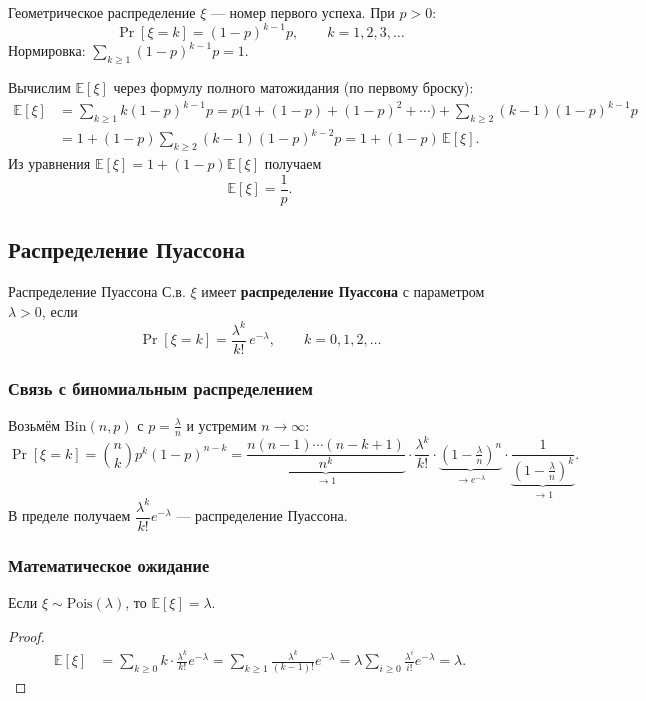 \begin{Example}{Геометрическое распределение}{}
	$\xi$ — номер первого успеха. При $p>0$:
	\[
	\Pr[\xi=k]=(1-p)^{k-1}p,\qquad k=1,2,3,\dots
	\]
	Нормировка: $\sum_{k\ge 1}(1-p)^{k-1}p=1$.
\end{Example}

Вычислим $\mathbb{E}[\xi]$ через формулу полного матожидания (по первому броску):
\begin{align*}
	\mathbb{E}[\xi]
	&=\sum_{k\ge 1}k(1-p)^{k-1}p
	=p\bigl(1+(1-p)+(1-p)^2+\cdots\bigr)+\sum_{k\ge 2}(k-1)(1-p)^{k-1}p\\
	&=1+(1-p)\sum_{k\ge 2}(k-1)(1-p)^{k-2}p
	=1+(1-p)\,\mathbb{E}[\xi].
\end{align*}
Из уравнения $\mathbb{E}[\xi]=1+(1-p)\mathbb{E}[\xi]$ получаем
\[
\mathbb{E}[\xi]=\frac1p.
\]

\subsection{Распределение Пуассона}

\begin{Definition}{Распределение Пуассона}{}
	С.в. $\xi$ имеет \textbf{распределение Пуассона} с параметром $\lambda>0$, если
	\[
	\Pr[\xi=k]=\frac{\lambda^k}{k!}\,e^{-\lambda},\qquad k=0,1,2,\dots
	\]
\end{Definition}

\subsubsection*{Связь с биномиальным распределением}

Возьмём $\mathrm{Bin}(n,p)$ с $p=\tfrac{\lambda}{n}$ и устремим $n\to\infty$:
\[
\Pr[\xi=k]=\binom{n}{k}p^k(1-p)^{n-k}
=\underbrace{\frac{n(n-1)\cdots(n-k+1)}{n^k}}_{\to 1}\cdot\frac{\lambda^k}{k!}\cdot\underbrace{\left(1-\tfrac{\lambda}{n}\right)^n}_{\to e^{-\lambda}}\cdot\underbrace{\frac{1}{\left(1-\tfrac{\lambda}{n}\right)^k}}_{\to 1}.
\]
В пределе получаем $\dfrac{\lambda^k}{k!}e^{-\lambda}$ — распределение Пуассона.

\subsubsection*{Математическое ожидание}

\begin{Statement}{}{}
	Если $\xi\sim\mathrm{Pois}(\lambda)$, то $\mathbb{E}[\xi]=\lambda$.
\end{Statement}

\begin{proof}
	\begin{align*}
		\mathbb{E}[\xi]
		&=\sum_{k\ge 0}k\cdot\frac{\lambda^k}{k!}e^{-\lambda}
		=\sum_{k\ge 1}\frac{\lambda^k}{(k-1)!}e^{-\lambda}
		=\lambda\sum_{i\ge 0}\frac{\lambda^i}{i!}e^{-\lambda}
		=\lambda.
	\end{align*}
\end{proof}
